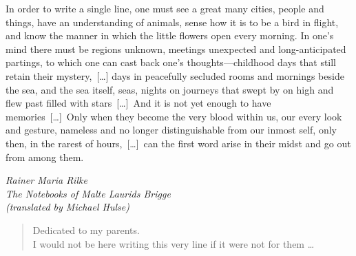 
\begin{dedication} 
\setlength{\epigraphwidth}{0.63\textwidth}

\vspace*{-.25\paperheight}  
\epigraph{%
	In order to write a single line, one must see a great many cities, people and things, have an understanding of animals, sense how it is to be a bird in flight, and know the manner in which the little flowers open every morning. In one's mind there must be regions unknown, meetings unexpected and long-anticipated partings, to which one can cast back one's thoughts---childhood days that still retain their mystery,~[\dots] days in peacefully secluded rooms and mornings beside the sea, and the sea itself, seas, nights on journeys that swept by on high and flew past filled with stars~[\dots]~And it is not yet enough to have memories~[\dots]~Only when they become the very blood within us, our every look and gesture, nameless and no longer distinguishable from our inmost self, only then, in the rarest of hours,~[\dots]~can the first word arise in their midst and go out from among them.}{\textit{Rainer Maria Rilke\\ The Notebooks of Malte Laurids Brigge~\\(translated by Michael Hulse)}}


\begin{quote} 
	\centering \vspace{2cm}
	\Large{Dedicated to my parents.}\\
	I would not be here writing this very line if it were not for them \ldots 
\end{quote}



\end{dedication}
